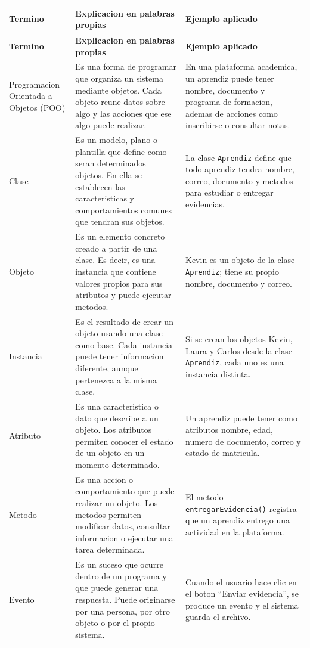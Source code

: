 \documentclass[12pt,letterpaper]{article}
\begin{document}
\renewcommand{\arraystretch}{1.35}
\begin{longtable}{|p{3cm}|p{7cm}|p{4cm}|}
\hline
\textbf{Termino} & \textbf{Explicacion en palabras propias} & \textbf{Ejemplo aplicado} \\
\hline
\endfirsthead
\hline
\textbf{Termino} & \textbf{Explicacion en palabras propias} & \textbf{Ejemplo aplicado} \\
\hline
\endhead
\hline
\endfoot
\hline
\endlastfoot

Programacion Orientada a Objetos (POO) & Es una forma de programar que organiza un sistema mediante objetos. Cada objeto reune datos sobre algo y las acciones que ese algo puede realizar. & En una plataforma academica, un aprendiz puede tener nombre, documento y programa de formacion, ademas de acciones como inscribirse o consultar notas. \\
\hline
Clase & Es un modelo, plano o plantilla que define como seran determinados objetos. En ella se establecen las caracteristicas y comportamientos comunes que tendran sus objetos. & La clase \texttt{Aprendiz} define que todo aprendiz tendra nombre, correo, documento y metodos para estudiar o entregar evidencias. \\
\hline
Objeto & Es un elemento concreto creado a partir de una clase. Es decir, es una instancia que contiene valores propios para sus atributos y puede ejecutar metodos. & Kevin es un objeto de la clase \texttt{Aprendiz}; tiene su propio nombre, documento y correo. \\
\hline
Instancia & Es el resultado de crear un objeto usando una clase como base. Cada instancia puede tener informacion diferente, aunque pertenezca a la misma clase. & Si se crean los objetos Kevin, Laura y Carlos desde la clase \texttt{Aprendiz}, cada uno es una instancia distinta. \\
\hline
Atributo & Es una caracteristica o dato que describe a un objeto. Los atributos permiten conocer el estado de un objeto en un momento determinado. & Un aprendiz puede tener como atributos nombre, edad, numero de documento, correo y estado de matricula. \\
\hline
Metodo & Es una accion o comportamiento que puede realizar un objeto. Los metodos permiten modificar datos, consultar informacion o ejecutar una tarea determinada. & El metodo \texttt{entregarEvidencia()} registra que un aprendiz entrego una actividad en la plataforma. \\
\hline
Evento & Es un suceso que ocurre dentro de un programa y que puede generar una respuesta. Puede originarse por una persona, por otro objeto o por el propio sistema. & Cuando el usuario hace clic en el boton ``Enviar evidencia'', se produce un evento y el sistema guarda el archivo. \\

\end{longtable}
\end{document}
